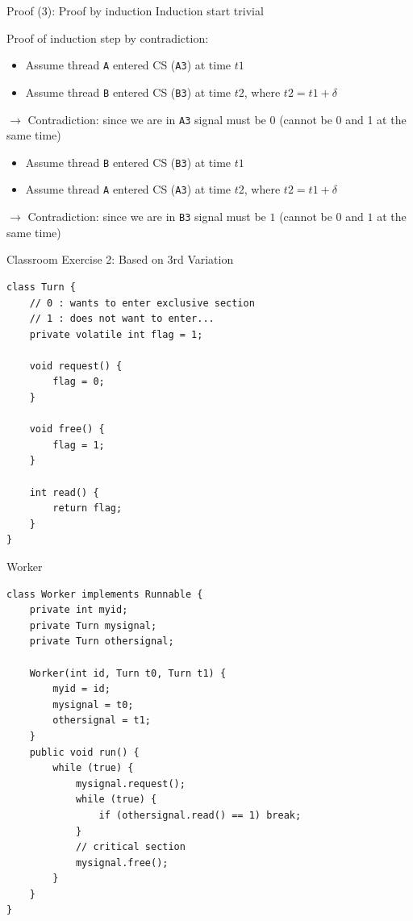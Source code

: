 \begin{frame}[fragile]{Proof (3): Proof by induction}
  Induction start trivial


  Proof of induction step by contradiction:

  \begin{itemize}
  \item Assume thread \lstinline!A! entered CS (\lstinline!A3!) at time $t1$
  \item Assume thread \lstinline!B! entered CS (\lstinline!B3!) at time $t2$, where $t2 = t1 +
    \delta$
  \end{itemize}

  $\rightarrow$ \alert{Contradiction}: since we are in \lstinline!A3!
  signal \alert{must} be 0 (cannot be 0 and 1 at the same time)


  \begin{itemize}
  \item Assume thread \lstinline!B! entered CS (\lstinline!B3!) at time $t1$
  \item Assume thread \lstinline!A! entered CS (\lstinline!A3!) at time $t2$,
    where $t2 = t1 + \delta$
  \end{itemize}

  $\rightarrow$ \alert{Contradiction}: since we are in \lstinline!B3!
  signal \alert{must} be $1$ (cannot be $0$ and $1$ at the same time)
\end{frame}

\begin{frame}[fragile]{Classroom Exercise 2: Based on 3rd Variation}
\begin{lstlisting}[basicstyle=\fontsize{10}{12}\selectfont\ttfamily]
class Turn {
    // 0 : wants to enter exclusive section
    // 1 : does not want to enter...
    private volatile int flag = 1;

    void request() { 
        flag = 0;
    }

    void free() { 
        flag = 1; 
    }

    int read() { 
        return flag; 
    }
}
\end{lstlisting}
\end{frame}

\begin{frame}[fragile]{Worker}
\begin{lstlisting}[basicstyle=\fontsize{8}{10}\selectfont\ttfamily]
class Worker implements Runnable {
    private int myid;
    private Turn mysignal;
    private Turn othersignal;
    
    Worker(int id, Turn t0, Turn t1) {
        myid = id;
        mysignal = t0;
        othersignal = t1;
    }
    public void run() {
        while (true) {
            mysignal.request();
            while (true) {
                if (othersignal.read() == 1) break;
            }
            // critical section
            mysignal.free();
        }
    }
}
\end{lstlisting}
\end{frame}

